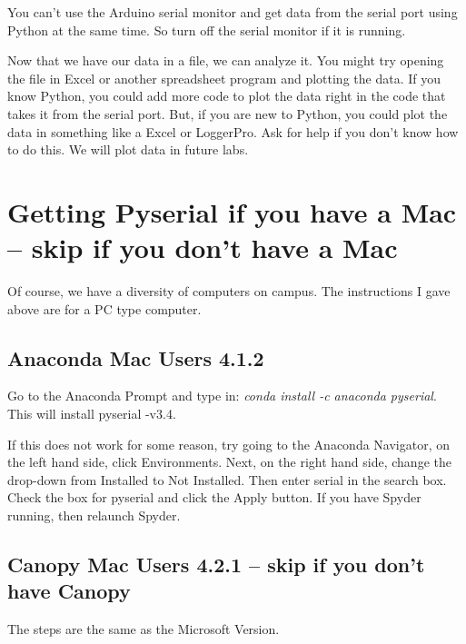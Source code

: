 You can't use the Arduino serial monitor and get data from the serial port using Python at the same time. So turn off the serial monitor if it is running.

Now that we have our data in a file, we can analyze it. You might try opening the file in Excel or another spreadsheet program and plotting the data. If you know Python, you could add more code to plot the data right in the code that takes it from the serial port. But, if you are new to Python, you could plot the data in something like a Excel or LoggerPro. Ask for help if you don't know how to do this. We will plot data in future labs.

\section{Getting Pyserial if you have a Mac -- skip if you don't have a Mac}

Of course, we have a diversity of computers on campus. The instructions I gave above are for a PC type computer.

\subsection{Anaconda Mac Users 4.1.2}

Go to the Anaconda Prompt and type in: \textit{conda install -c anaconda pyserial}. This will install pyserial -v3.4.


If this does not work for some reason, try going to the Anaconda Navigator, on the left hand side, click Environments. Next, on the right hand side, change the drop-down from Installed to Not Installed. Then enter serial in the search box. Check the box for pyserial and click the Apply button. If you have Spyder running, then relaunch Spyder.


\subsection{Canopy Mac Users 4.2.1 -- skip if you don't have Canopy}

The steps are the same as the Microsoft Version.

